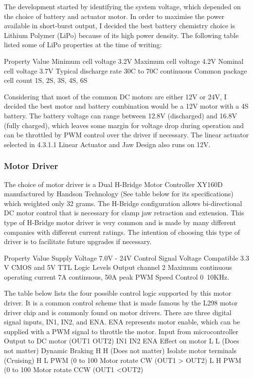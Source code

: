 The development started by identifying the system voltage, which depended on the choice of battery and actuator motor. In order to maximise the power available in short-burst output, I decided the best battery chemistry choice is Lithium Polymer (LiPo) because of its high power density. The following table listed some of LiPo properties at the time of writing:

Property
Value
Minimum cell voltage
3.2V
Maximum cell voltage
4.2V
Nominal cell voltage
3.7V
Typical discharge rate
30C to 70C continuous
Common package cell count
1S, 2S, 3S, 4S, 6S

Considering that most of the common DC motors are either 12V or 24V, I decided the best motor and battery combination would be a 12V motor with a 4S battery. The battery voltage can range between 12.8V (discharged) and 16.8V (fully charged), which leaves some margin for voltage drop during operation and can be throttled by PWM control over the driver if necessary. The linear actuator selected in 4.3.1.1 Linear Actuator and Jaw Design also runs on 12V.

\subsubsection{Motor Driver}
\label{subsubsection:exploration_1_motor_driver}

The choice of motor driver is a Dual H-Bridge Motor Controller XY160D manufactured by Handson Technology (See table below for its specifications) which weighted only 32 grams. The H-Bridge configuration allows bi-directional DC motor control that is necessary for clamp jaw retraction and extension. This type of H-Bridge motor driver is very common and is made by many different companies with different current ratings. The intention of choosing this type of driver is to facilitate future upgrades if necessary. 

Property
Value
Supply Voltage
7.0V - 24V
Control Signal Voltage
Compatible 3.3 V CMOS and  5V TTL Logic Levels
Output channel
2
Maximum continuous operating current
7A continuous, 50A peak
PWM Speed Control
0~10KHz.



The table below lists the four possible control logic supported by this motor driver. It is a common control scheme that is made famous by the L298 motor driver chip and is commonly found on motor drivers. There are three digital signal inputs, IN1, IN2, and ENA. ENA represents motor enable, which can be supplied with a PWM signal to throttle the motor.
Input from microcontroller
Output to DC motor (OUT1 OUT2)
IN1
IN2
ENA 
Effect on motor 
L
L
(Does not matter)
Dynamic Braking
H
H
(Does not matter)
Isolate motor terminals (Cruising)
H
L
PWM (0 to 100%
Motor rotate CW (OUT1 > OUT2)
L
H
PWM (0 to 100%
Motor rotate CCW (OUT1 <OUT2)


